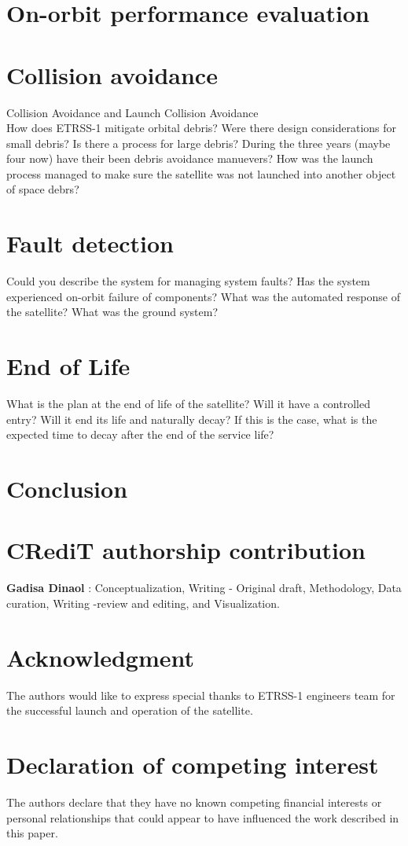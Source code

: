 \documentclass[final,5p,times,twocolumn]{elsarticle}
\begin{document}
\section{On-orbit performance evaluation}
\section{Collision avoidance }
Collision Avoidance and Launch Collision Avoidance\\
How does ETRSS-1 mitigate orbital debris?  Were there design considerations for small debris?  Is there a process for large debris?  During the three years (maybe four now) have their been debris avoidance manuevers?  How was the launch process managed to make sure the satellite was not launched into another object of space debrs?
\section{Fault detection}
Could you describe the system for managing system faults? Has the system experienced on-orbit failure of components?  What was the automated response of the satellite?  What was the ground system?
\section{End of Life}
What is the plan at the end of life of the satellite?  Will it have a controlled entry?  Will it end its life and naturally decay?  If this is the case, what is the expected time to decay after the end of the service life?
\section{Conclusion}
\section*{CRediT authorship contribution }
\textbf{Gadisa Dinaol }: Conceptualization,  Writing - Original draft, Methodology, Data curation, Writing -review and editing, and Visualization.\\

\section*{Acknowledgment}
The authors would like to express special thanks to ETRSS-1 engineers team for the successful launch and operation of the satellite.
\section*{Declaration of competing interest}
The authors declare that they have no known competing financial interests or personal relationships that could appear to have influenced the work described in this paper.
\end{document}
